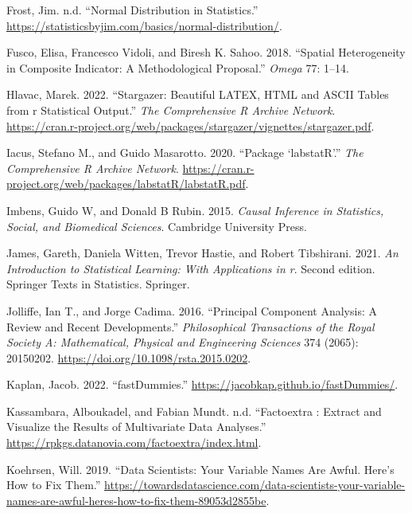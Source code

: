 \documentclass[
]{article}
\newlength{\cslhangindent}
\newlength{\cslentryspacingunit} %
\newenvironment{CSLReferences}[2] %
 {%
  \setlength{\parindent}{0pt}
  \ifodd #1
  \let\oldpar\par
  \def\par{\hangindent=\cslhangindent\oldpar}
  \fi
  \setlength{\parskip}{#2\cslentryspacingunit}
 }%
 {}
\begin{document}
\begin{CSLReferences}{1}{0}
\leavevmode{}%
Frost, Jim. n.d. {``Normal Distribution in Statistics.''} \url{https://statisticsbyjim.com/basics/normal-distribution/}.

\leavevmode{}%
Fusco, Elisa, Francesco Vidoli, and Biresh K. Sahoo. 2018. {``Spatial Heterogeneity in Composite Indicator: A Methodological Proposal.''} \emph{Omega} 77: 1--14.

\leavevmode{}%
Hlavac, Marek. 2022. {``Stargazer: Beautiful LATEX, HTML and ASCII Tables from r Statistical Output.''} \emph{The Comprehensive R Archive Network}. \url{https://cran.r-project.org/web/packages/stargazer/vignettes/stargazer.pdf}.

\leavevmode{}%
Iacus, Stefano M., and Guido Masarotto. 2020. {``Package {`labstatR'}.''} \emph{The Comprehensive R Archive Network}. \url{https://cran.r-project.org/web/packages/labstatR/labstatR.pdf}.

\leavevmode{}%
Imbens, Guido W, and Donald B Rubin. 2015. \emph{Causal Inference in Statistics, Social, and Biomedical Sciences}. Cambridge University Press.

\leavevmode{}%
James, Gareth, Daniela Witten, Trevor Hastie, and Robert Tibshirani. 2021. \emph{An Introduction to Statistical Learning: With Applications in r}. Second edition. Springer Texts in Statistics. Springer.

\leavevmode{}%
Jolliffe, Ian T., and Jorge Cadima. 2016. {``Principal Component Analysis: A Review and Recent Developments.''} \emph{Philosophical Transactions of the Royal Society A: Mathematical, Physical and Engineering Sciences} 374 (2065): 20150202. \url{https://doi.org/10.1098/rsta.2015.0202}.

\leavevmode{}%
Kaplan, Jacob. 2022. {``fastDummies.''} \url{https://jacobkap.github.io/fastDummies/}.

\leavevmode{}%
Kassambara, Alboukadel, and Fabian Mundt. n.d. {``Factoextra : Extract and Visualize the Results of Multivariate Data Analyses.''} \url{https://rpkgs.datanovia.com/factoextra/index.html}.

\leavevmode{}%
Koehrsen, Will. 2019. {``Data Scientists: Your Variable Names Are Awful. Here's How to Fix Them.''} \url{https://towardsdatascience.com/data-scientists-your-variable-names-are-awful-heres-how-to-fix-them-89053d2855be}.


\end{CSLReferences}
\end{document}
